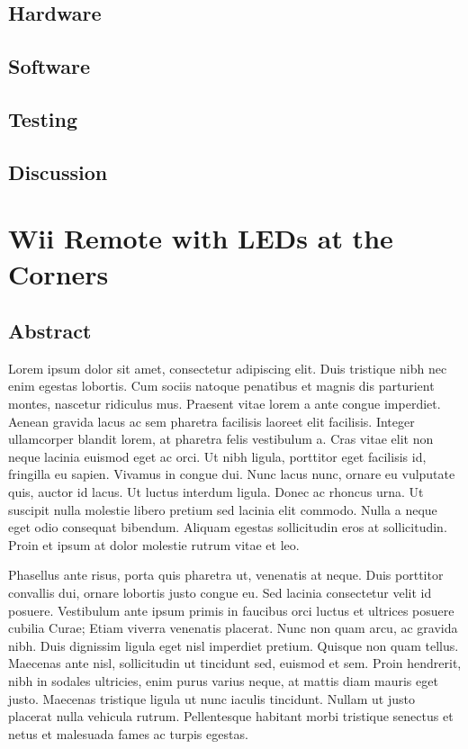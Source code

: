 \documentclass[12pt]{report}	%
\begin{document}
	\section{Hardware}
	\section{Software}
	\section{Testing}
	\section{Discussion}
	
\chapter{Wii Remote with LEDs at the Corners}
	\section{Abstract}
	Lorem ipsum dolor sit amet, consectetur adipiscing elit. Duis tristique nibh nec enim egestas lobortis. Cum sociis natoque penatibus et magnis dis parturient montes, nascetur ridiculus mus. Praesent vitae lorem a ante congue imperdiet. Aenean gravida lacus ac sem pharetra facilisis laoreet elit facilisis. Integer ullamcorper blandit lorem, at pharetra felis vestibulum a. Cras vitae elit non neque lacinia euismod eget ac orci. Ut nibh ligula, porttitor eget facilisis id, fringilla eu sapien. Vivamus in congue dui. Nunc lacus nunc, ornare eu vulputate quis, auctor id lacus. Ut luctus interdum ligula. Donec ac rhoncus urna. Ut suscipit nulla molestie libero pretium sed lacinia elit commodo. Nulla a neque eget odio consequat bibendum. Aliquam egestas sollicitudin eros at sollicitudin. Proin et ipsum at dolor molestie rutrum vitae et leo.

  Phasellus ante risus, porta quis pharetra ut, venenatis at neque. Duis porttitor convallis dui, ornare lobortis justo congue eu. Sed lacinia consectetur velit id posuere. Vestibulum ante ipsum primis in faucibus orci luctus et ultrices posuere cubilia Curae; Etiam viverra venenatis placerat. Nunc non quam arcu, ac gravida nibh. Duis dignissim ligula eget nisl imperdiet pretium. Quisque non quam tellus. Maecenas ante nisl, sollicitudin ut tincidunt sed, euismod et sem. Proin hendrerit, nibh in sodales ultricies, enim purus varius neque, at mattis diam mauris eget justo. Maecenas tristique ligula ut nunc iaculis tincidunt. Nullam ut justo placerat nulla vehicula rutrum. Pellentesque habitant morbi tristique senectus et netus et malesuada fames ac turpis egestas.
\end{document}
